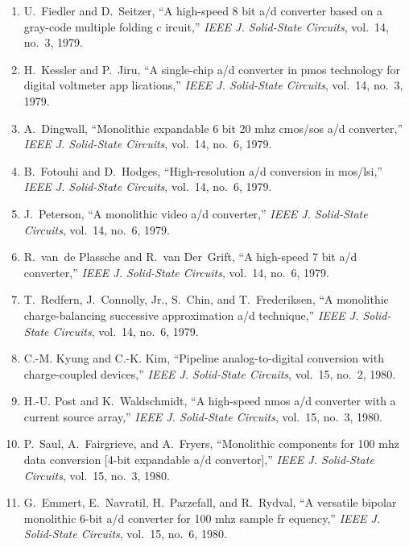 \begin{enumerate}
\item
U.~Fiedler and D.~Seitzer, ``A high-speed 8 bit a/d converter based on a
  gray-code multiple folding c ircuit,'' \emph{{IEEE} J. Solid-State Circuits},
  vol.~14, no.~3, 1979.

\item
H.~Kessler and P.~Jiru, ``A single-chip a/d converter in pmos technology for
  digital voltmeter app lications,'' \emph{{IEEE} J. Solid-State Circuits},
  vol.~14, no.~3, 1979.

\item
A.~Dingwall, ``Monolithic expandable 6 bit 20 mhz cmos/sos a/d converter,''
  \emph{{IEEE} J. Solid-State Circuits}, vol.~14, no.~6, 1979.

\item
B.~Fotouhi and D.~Hodges, ``High-resolution a/d conversion in mos/lsi,''
  \emph{{IEEE} J. Solid-State Circuits}, vol.~14, no.~6, 1979.

\item
J.~Peterson, ``A monolithic video a/d converter,'' \emph{{IEEE} J. Solid-State
  Circuits}, vol.~14, no.~6, 1979.

\item
R.~van~de Plassche and R.~van Der~Grift, ``A high-speed 7 bit a/d converter,''
  \emph{{IEEE} J. Solid-State Circuits}, vol.~14, no.~6, 1979.

\item
T.~Redfern, J.~Connolly, Jr., S.~Chin, and T.~Frederiksen, ``A monolithic
  charge-balancing successive approximation a/d technique,'' \emph{{IEEE} J.
  Solid-State Circuits}, vol.~14, no.~6, 1979.

\item
C.-M. Kyung and C.-K. Kim, ``Pipeline analog-to-digital conversion with
  charge-coupled devices,'' \emph{{IEEE} J. Solid-State Circuits}, vol.~15,
  no.~2, 1980.

\item
H.-U. Post and K.~Waldschmidt, ``A high-speed nmos a/d converter with a current
  source array,'' \emph{{IEEE} J. Solid-State Circuits}, vol.~15, no.~3, 1980.

\item
P.~Saul, A.~Fairgrieve, and A.~Fryers, ``Monolithic components for 100 mhz data
  conversion [4-bit expandable a/d convertor],'' \emph{{IEEE} J. Solid-State
  Circuits}, vol.~15, no.~3, 1980.

\item
G.~Emmert, E.~Navratil, H.~Parzefall, and R.~Rydval, ``A versatile bipolar
  monolithic 6-bit a/d converter for 100 mhz sample fr equency,'' \emph{{IEEE}
  J. Solid-State Circuits}, vol.~15, no.~6, 1980.


\end{enumerate}
